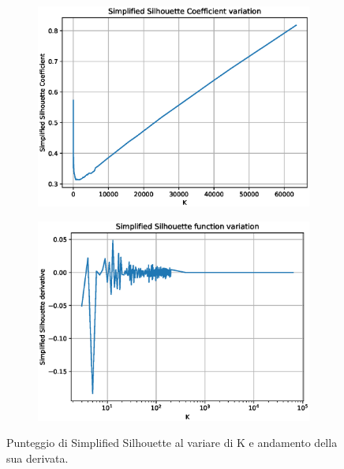 \documentclass[
	11pt, %
	a4paper, %
	oneside, %
	headinclude,footinclude, %
	BCOR5mm, %
]{scrartcl}
\begin{document}
		\begin{figure}[!htb]
			\hspace{-1cm}
				\begin{subfigure}{.5\textwidth}
				\centering
				\includegraphics[scale=.5]{Figures/simplifiedSilhouette.eps}
				\end{subfigure}
			\hspace{0.5cm}
				\begin{subfigure}{.5\textwidth}
				\centering
				\includegraphics[scale=.5]{Figures/simplifiedSilhouetteDerivative.eps}
				\end{subfigure}
			\caption{Punteggio di Simplified Silhouette al variare di K e andamento della sua derivata.}
			\label{fig:silhouetteValidation}
		\end{figure}
\end{document}
